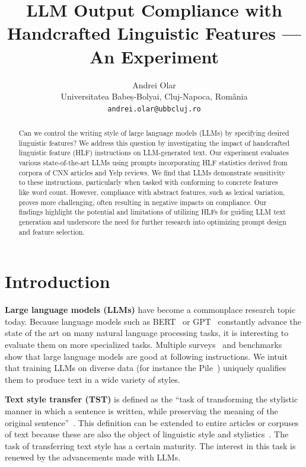 \documentclass[11pt]{article}
\title{LLM Output Compliance with Handcrafted Linguistic Features --- An Experiment}
\author{Andrei Olar\\
Universitatea Babeș-Bolyai, Cluj-Napoca, România\\
\texttt{andrei.olar@ubbcluj.ro}\\}
\begin{document}
\maketitle
\begin{abstract}
    Can we control the writing style of large language models (LLMs) by specifying
    desired linguistic features?
    We address this question by investigating the impact of handcrafted linguistic
    feature (HLF) instructions on LLM-generated text.
    Our experiment evaluates various state-of-the-art LLMs using prompts
    incorporating HLF statistics derived from corpora of CNN articles and Yelp
    reviews.
    We find that LLMs demonstrate sensitivity to these instructions, particularly
    when tasked with conforming to concrete features like word count.
    However, compliance with abstract features, such as lexical variation, proves
    more challenging, often resulting in negative impacts on compliance.
    Our findings highlight the potential and limitations of utilizing HLFs for
    guiding LLM text generation and underscore the need for further research into
    optimizing prompt design and feature selection.
\end{abstract}


\section{Introduction}\label{introduction}

\textbf{Large language models (LLMs)} have become a commonplace research topic
today.
Because language models such as BERT~\cite{devlin2018bert} or
GPT~\cite{gpt-2018,gpt2-2019,gpt3-2020} constantly advance the state of the art
on many natural language processing tasks, it is interesting to evaluate them on
more specialized tasks.
Multiple surveys~\cite{minaee2024llmsurvey,zhao2023survey} and
benchmarks~\cite{papcode2024hellaswag,chiang2024chatbot} show that large
language models are good at following instructions.
We intuit that training LLMs on diverse data (for instance the
Pile~\cite{gao2020pile}) uniquely qualifies them to produce text in a wide
variety of styles.

\textbf{Text style transfer (TST)} is defined as the ``task of transforming the
stylistic manner in which a sentence is written, while preserving the meaning of
the original sentence''~\cite{tst-review-2021}.
This definition can be extended to entire articles or corpuses of text because
these are also the object of linguistic style and
stylistics~\cite{lugea2023stylistics}.
The task of transferring text style has a certain maturity.
The interest in this task is renewed by the advancements made with LLMs.
\end{document}
